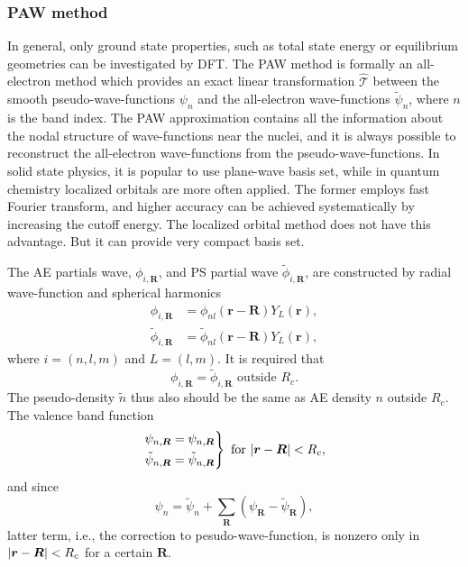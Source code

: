 
\subsubsection{PAW method}
\label{sssec:paw}

In general, only ground state properties, such as total state energy or
equilibrium geometries can be investigated by DFT.\cite{Enkovaara:2010jd}
The PAW method is formally an all-electron method which provides an exact linear
transformation
$\hat{\mathcal{T}}$
between the smooth pseudo-wave-functions $\psi_n$ and the
all-electron wave-functions $\tilde{\psi}_n$, where $n$ is the band index.
The PAW approximation contains all the information about the nodal structure of
wave-functions near the nuclei, and it is always possible to reconstruct the
all-electron wave-functions from the pseudo-wave-functions.
In solid state physics, it is popular to use plane-wave basis set, while in
quantum chemistry localized orbitals are more often applied.
The former employs fast Fourier transform, and higher accuracy can be achieved
systematically by increasing the cutoff energy. The localized orbital method does
not have this advantage. But it can provide very compact basis set.

The AE partials wave, $\phi_{i, \bm{R}}$, and PS partial wave $\tilde{\phi}_{i, \bm{R}}$,
are constructed by radial wave-function and spherical harmonics
\begin{align}
	\phi_{i, \bm{R}}         & = \phi_{nl} (\bm{r} - \bm{R}) Y_L(\bm{r}),         \\
	\tilde{\phi}_{i, \bm{R}} & = \tilde{\phi}_{nl} (\bm{r} - \bm{R}) Y_L(\bm{r}),
	\label{eq:tildephi}
\end{align}
where $i = (n, l, m)$ and $L = (l, m)$.\cite{Mortensen:2005ep}
It is required that
\begin{equation}
	\phi_{i, \bm{R}} = \tilde{\phi}_{i, \bm{R}} \text{ outside } R_c.
\end{equation}
The pseudo-density $\tilde{n}$ thus also should be the same as AE density
$n$ outside $R_c$.
The valence band function
\begin{equation}
	\begin{rcases}
		\psi_{n, \bm{R}} = \psi_{n, \bm{R}} \\
		\tilde{\psi}_{n, \bm{R}} = \tilde{\psi}_{n, \bm{R}}
	\end{rcases}
	\text{ for } \abs{\bm{r} - \bm{R}} < R_c,
\end{equation}
and since
\begin{equation}
	\psi_n = \tilde{\psi}_n + \sum_{\bm{R}} (\psi_{\bm{R}} - \tilde{\psi}_{\bm{R}}),
\end{equation}
latter term, i.e.,
the correction to pesudo-wave-function,
is nonzero only in $\abs{\bm{r} - \bm{R}} < R_c$
for a certain $\bm{R}$.

